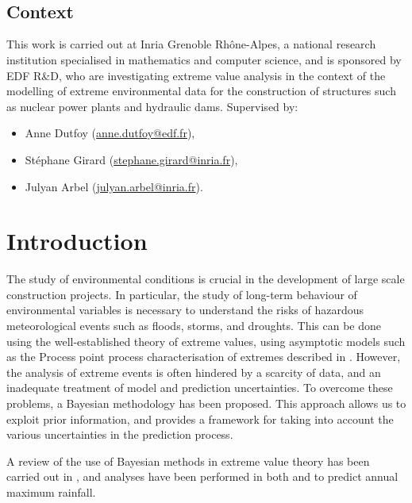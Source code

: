 \documentclass{article}
\title{%
	\vspace{-15mm}\Huge{\hwtitle}\\
	\Large\vspace{1mm}\hwname\\
	\Large\vspace{1mm}\small{\itshape\hwdate}\vspace{-15mm}}
\date{}
\author{}
\begin{document}
%	
\maketitle
%
\subsection*{Context}
%

%
This work is carried out at Inria Grenoble Rhône-Alpes,
a national research institution specialised in mathematics and
computer science,
and is sponsored by EDF R\&D,
who are investigating extreme value analysis
in the context of the modelling
of extreme environmental data
for the construction of structures
such as nuclear power plants and hydraulic dams.
Supervised by:
%
\begin{itemize}
	\item Anne Dutfoy (\href{mailto:anne.dutfoy@edf.fr}{anne.dutfoy@edf.fr}),
	\item Stéphane Girard (\href{mailto:stephane.girard@inria.fr}{stephane.girard@inria.fr}),
	\item Julyan Arbel (\href{mailto:julyan.arbel@inria.fr}{julyan.arbel@inria.fr}).
\end{itemize}
%
\section{Introduction}
%

%
The study of environmental conditions is crucial
in the development of large scale construction projects.
In particular, the study of long-term behaviour
of environmental variables is necessary to understand
the risks of hazardous meteorological events such as
floods, storms, and droughts.
This can be done using the well-established theory of extreme values,
using asymptotic models such as the Process point process characterisation
of extremes described in \cite{coles2001}.
However, the analysis of extreme events is often hindered
by a scarcity of data, and an inadequate treatment
of model and prediction uncertainties.
To overcome these problems, a Bayesian methodology has been proposed.
This approach allows us to exploit prior information,
and provides a framework for taking into account the various uncertainties
in the prediction process.
%

%
A review of the use of Bayesian methods in extreme value theory
has been carried out in \cite{coles1996review},
and analyses have been performed in both
\cite{coles2003} and \cite{coles1996}
to predict annual maximum rainfall.
%
\end{document}

